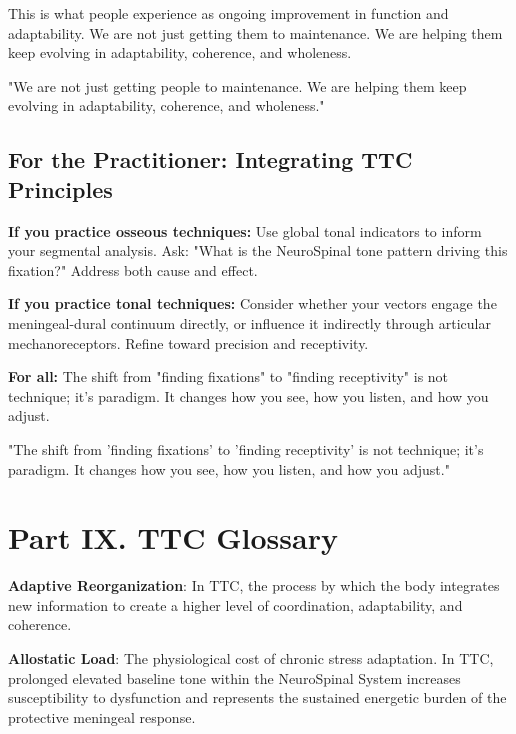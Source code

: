\documentclass[11pt,letterpaper]{article}
\begin{document}
This is what people experience as ongoing improvement in function and adaptability. We are not just getting them to maintenance. We are helping them keep evolving in adaptability, coherence, and wholeness.


\begin{pullquotebox}
"We are not just getting people to maintenance. We are helping them keep evolving in adaptability, coherence, and wholeness."
\end{pullquotebox}


\subsection{For the Practitioner: Integrating TTC Principles}

\textbf{If you practice osseous techniques:} Use global tonal indicators to inform your segmental analysis. Ask: "What is the NeuroSpinal tone pattern driving this fixation?" Address both cause and effect.


\textbf{If you practice tonal techniques:} Consider whether your vectors engage the meningeal-dural continuum directly, or influence it indirectly through articular mechanoreceptors. Refine toward precision and receptivity.


\textbf{For all:} The shift from "finding fixations" to "finding receptivity" is not technique; it's paradigm. It changes how you see, how you listen, and how you adjust.


\begin{pullquotebox}
"The shift from 'finding fixations' to 'finding receptivity' is not technique; it's paradigm. It changes how you see, how you listen, and how you adjust."
\end{pullquotebox}


\section{Part IX. TTC Glossary}

\textbf{Adaptive Reorganization}: In TTC, the process by which the body integrates new information to create a higher level of coordination, adaptability, and coherence.


\textbf{Allostatic Load}: The physiological cost of chronic stress adaptation. In TTC, prolonged elevated baseline tone within the NeuroSpinal System increases susceptibility to dysfunction and represents the sustained energetic burden of the protective meningeal response.
\end{document}
